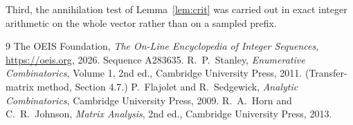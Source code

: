 \documentclass[11pt,a4paper]{article}
\theoremstyle{plain}
\theoremstyle{definition}
\begin{document}
Third, the annihilation test of Lemma~\ref{lem:crit} was carried out in exact integer
arithmetic on the whole vector rather than on a sampled prefix.

\begin{thebibliography}{9}
 The OEIS Foundation, \emph{The On-Line Encyclopedia of Integer
Sequences}, \url{https://oeis.org}, 2026. Sequence A283635.
 R.~P.~Stanley, \emph{Enumerative Combinatorics}, Volume 1, 2nd ed.,
Cambridge University Press, 2011. (Transfer-matrix method, Section 4.7.)
 P.~Flajolet and R.~Sedgewick, \emph{Analytic Combinatorics}, Cambridge
University Press, 2009.
 R.~A.~Horn and C.~R.~Johnson, \emph{Matrix Analysis}, 2nd ed., Cambridge
University Press, 2013.
\end{thebibliography}
\end{document}

